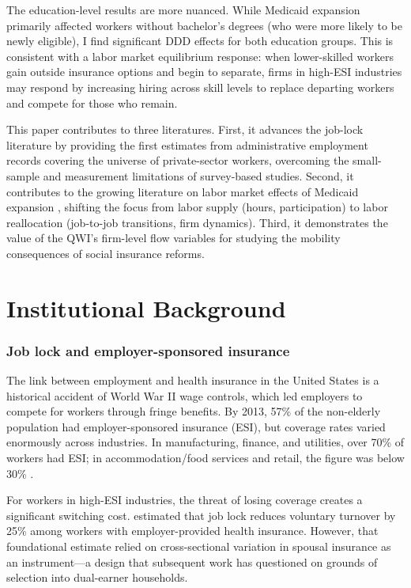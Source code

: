 \documentclass[12pt]{article}
\begin{document}
The education-level results are more nuanced. While Medicaid expansion primarily affected workers without bachelor's degrees (who were more likely to be newly eligible), I find significant DDD effects for both education groups. This is consistent with a labor market equilibrium response: when lower-skilled workers gain outside insurance options and begin to separate, firms in high-ESI industries may respond by increasing hiring across skill levels to replace departing workers and compete for those who remain.

This paper contributes to three literatures. First, it advances the job-lock literature \citep{madrian1994employment, gruber1994health, hamersma2009effect, garthwaite2014public} by providing the first estimates from administrative employment records covering the universe of private-sector workers, overcoming the small-sample and measurement limitations of survey-based studies. Second, it contributes to the growing literature on labor market effects of Medicaid expansion \citep{leung2018can, kaestner2014effects, freedman2023health, duggan2020effects}, shifting the focus from labor supply (hours, participation) to labor reallocation (job-to-job transitions, firm dynamics). Third, it demonstrates the value of the QWI's firm-level flow variables \citep{hyatt2014jobtojobtransitions} for studying the mobility consequences of social insurance reforms.

\section{Institutional Background}

\subsubsection*{Job lock and employer-sponsored insurance} The link between employment and health insurance in the United States is a historical accident of World War II wage controls, which led employers to compete for workers through fringe benefits. By 2013, 57\% of the non-elderly population had employer-sponsored insurance (ESI), but coverage rates varied enormously across industries. In manufacturing, finance, and utilities, over 70\% of workers had ESI; in accommodation/food services and retail, the figure was below 30\% \citep{buchmueller2016effect}.

For workers in high-ESI industries, the threat of losing coverage creates a significant switching cost. \citet{madrian1994employment} estimated that job lock reduces voluntary turnover by 25\% among workers with employer-provided health insurance. However, that foundational estimate relied on cross-sectional variation in spousal insurance as an instrument---a design that subsequent work has questioned on grounds of selection into dual-earner households.
\end{document}
